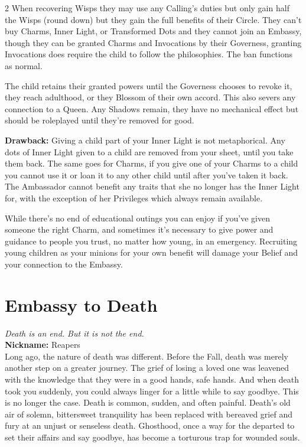 \begin{multicols}{2}
When recovering Wisps they may use any Calling’s duties but only gain half the Wisps (round down) but they gain the full benefits of their Circle. They can’t buy Charms, Inner Light, or Transformed Dots and they cannot join an Embassy, though they can be granted Charms and Invocations by their Governess, granting Invocations does require the child to follow the philosophies. The ban functions as normal. 

The child retains their granted powers until the Governess chooses to revoke it, they reach adulthood, or they Blossom of their own accord. This also severs any connection to a Queen. Any Shadows remain, they have no mechanical effect but should be roleplayed until they’re removed for good.

\textbf{Drawback:} Giving a child part of your Inner Light is not metaphorical. Any dots of Inner Light given to a child are removed from your sheet, until you take them back. The same goes for Charms, if you give one of your Charms to a child you cannot use it or loan it to any other child until after you’ve taken it back. The Ambassador cannot benefit any traits that she no longer has the Inner Light for, with the exception of her Privileges which always remain available.

While there’s no end of educational outings you can enjoy if you’ve given someone the right Charm, and sometimes it’s necessary to give power and guidance to people you trust, no matter how young, in an emergency. Recruiting young children as your minions for your own benefit will damage your Belief and your connection to the Embassy.



\section*{Embassy to Death}
\label{sec:EmbassyDeath}

\textit{Death is an end. But it is not the end.}\\

\noindent \textbf{Nickname:} Reapers\\

\noindent Long ago, the nature of death was different. Before the Fall, death was merely another step on a greater journey. The grief of losing a loved one was leavened with the knowledge that they were in a good hands, safe hands. And when death took you suddenly, you could always linger for a little while to say goodbye.  This is no longer the case. Death is common, sudden, and often painful. Death’s old air of solemn, bittersweet tranquility has been replaced with bereaved grief and fury at an unjust or senseless death. Ghosthood, once a way for the departed to set their affairs and say goodbye, has become a torturous trap for wounded souls.


\end{multicols}
